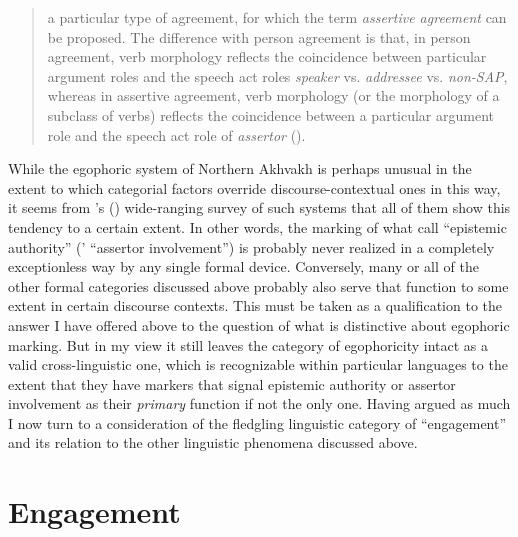 \documentclass[output=paper]{langsci/langscibook}
\begin{document}
\begin{quote}
	a particular type of agreement, for which the term \textit{assertive agreement} can be proposed. The difference with person agreement is that, in person agreement, verb morphology reflects the coincidence between particular argument roles and the speech act roles \textit{speaker} vs. \textit{addressee} vs. \textit{non-SAP}, where\-as in assertive agreement, verb morphology (or the morphology of a subclass of verbs) reflects the coincidence between a particular argument role and the speech act role of \textit{assertor} (\citealt[11]{Creissels2008}).
\end{quote}

While the egophoric system of Northern Akhvakh is perhaps unusual in the extent to which categorial factors override discourse-contextual ones in this way, it seems from \citeauthor{SanRoqueSchieffelin2018}’s (\citeyear{SanRoqueSchieffelin2018}) wide-ranging survey of such systems that all of them show this tendency to a certain extent. In other words, the marking of what \citeauthor{SanRoqueSchieffelin2018} call “epistemic authority” (\citeauthor{Creissels2008}’ “assertor involvement”) is probably never realized in a completely exceptionless way by any single formal device. Conversely, many or all of the other formal categories discussed above probably also serve that function to some extent in certain discourse contexts. This must be taken as a qualification to the answer I have offered above to the question of what is distinctive about egophoric marking. But in my view it still leaves the category of egophoricity intact as a valid cross-linguistic one, which is recognizable within particular languages to the extent that they have markers that signal epistemic authority or assertor involvement as their \textit{primary} function if not the only one. Having argued as much I now turn to a consideration of the fledgling linguistic category of “engagement” and its relation to the other linguistic phenomena discussed above.


\section{Engagement}\label{s:ar7}
\end{document}
